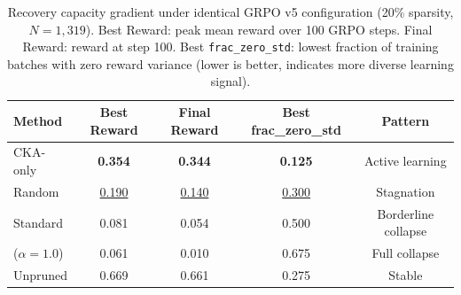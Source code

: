 \begin{table}[t]
\centering
\small
\caption{Recovery capacity gradient under identical GRPO v5 configuration (20\% sparsity, $N{=}1{,}319$). Best Reward: peak mean reward over 100 GRPO steps. Final Reward: reward at step 100. Best \texttt{frac\_zero\_std}: lowest fraction of training batches with zero reward variance (lower is better, indicates more diverse learning signal).}
\label{tab:recovery_gradient}
\begin{tabular}{lcccc}
\toprule
Method & Best Reward & Final Reward & Best frac\_zero\_std & Pattern \\
\midrule
CKA-only & \textbf{0.354} & \textbf{0.344} & \textbf{0.125} & Active learning \\
Random & \underline{0.190} & \underline{0.140} & \underline{0.300} & Stagnation \\
Standard & 0.081 & 0.054 & 0.500 & Borderline collapse \\
\rasp{} ($\alpha{=}1.0$) & 0.061 & 0.010 & 0.675 & Full collapse \\
\midrule
Unpruned & 0.669 & 0.661 & 0.275 & Stable \\
\bottomrule
\end{tabular}
\end{table}
